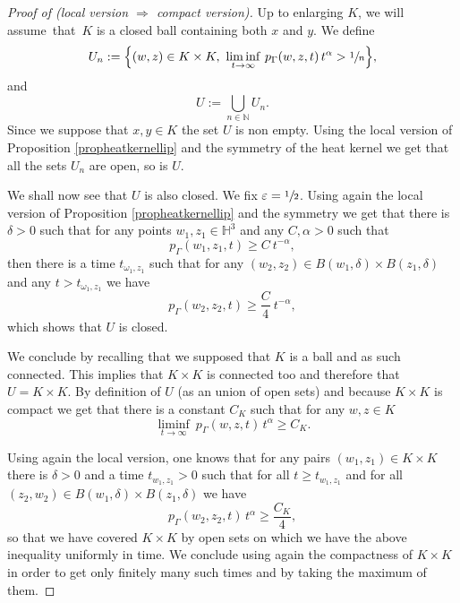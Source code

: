 \documentclass[JEP,XML,SOM,Unicode,NoFloatCountersInSection,published]{cedram}
\let\epsilon\varepsilon
\theoremstyle{plain}
\theoremstyle{definition}
\newcommand{\HH}{\mathbb{H}}
\newcommand{\limiinf}[1]{\underset{#1}{\liminf}}
\begin{document}
\begin{proof}[Proof of (local version $\Rightarrow$ compact version)]
Up to enlarging $K$, we will assume~that~$K$ is a closed ball containing both $x$ and $y$. We define
\[
U_n := \Bigl\{ (w,z) \in K \times K, \ \limiinf{t \to \infty} \ p_{\Gamma}(w,z,t) \, t^{\alpha} > \sfrac{1}{n} \Bigr\},
\]
and
\[
U := \bigcup_{n \in \mathbb{N}} U_n.
\]
Since we suppose that $x,y \in K$ the set $U$ is non empty. Using the local version of Proposition \ref{propheatkernellip} and the symmetry of the heat kernel we get that all the sets $U_n$ are open, so is $U$.

We shall now see that $U$ is also closed. We fix $\epsilon = \sfrac{1}{2}$. Using again the local version of Proposition \ref{propheatkernellip} and the symmetry we get that there is $\delta > 0$ such that for any points $w_1,z_1 \in \HH^3$ and any $C, \alpha > 0$ such that
\[
p_{\Gamma}(w_1,z_1,t) \ge C \ t^{-\alpha},
\]
then there is a time $t_{\omega_1,z_1}$ such that for any $(w_2,z_2) \in B(w_1, \delta) \times B(z_1,\delta)$ and any $t > t_{\omega_1,z_1}$ we have
\[
p_{\Gamma}(w_2,z_2,t) \ge \frac{C}{4} \ t^{-\alpha},
\]
which shows that $U$ is closed.

We conclude by recalling that we supposed that $K$ is a ball and as such connected. This implies that $K \times K$ is connected too and therefore that $U =K \times K$. By definition of $U$ (as an union of open sets) and because $K \times K$ is compact we get that there is a constant $C_K$ such that for any $w,z \in K$
\[
\limiinf{t \to \infty} \ p_{\Gamma}(w,z,t)\,t^{\alpha} \ge C_K.
\]

Using again the local version, one knows that for any pairs $(w_1,z_1) \in K \times K$ there is $\delta > 0$ and a time $t_{w_1,z_1} > 0$ such that for all $t \ge t_{w_1,z_1}$ and for all $(z_2,w_2) \in B(w_1,\delta) \times B(z_1,\delta)$ we have
\[
p_{\Gamma}(w_2,z_2,t)\,t^{\alpha} \ge \frac{C_K}{4},
\]
so that we have covered $K \times K$ by open sets on which we have the above inequality uniformly in time. We conclude using again the compactness of $K \times K$ in order to get only finitely many such times and by taking the maximum of them.
\end{proof}
\end{document}
